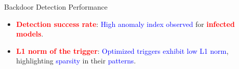 \documentclass{beamer}
\begin{document}
\begin{frame}{Backdoor Detection Performance}

    \begin{itemize}
        \item<1-> \textbf{\textcolor{red}{Detection success rate}}: \textcolor{blue}{High anomaly index observed} for \textbf{\textcolor{red}{infected models}}.
        \pause
        \item<2-> \textbf{\textcolor{red}{L1 norm of the trigger}}: \textcolor{blue}{Optimized triggers exhibit low L1 norm}, highlighting \textcolor{blue}{sparsity} in their \textcolor{blue}{patterns}.
        \pause
    \end{itemize}


\end{frame}
\end{document}
